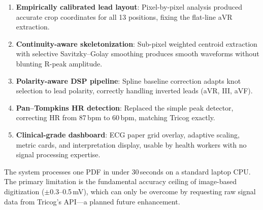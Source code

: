 \documentclass[conference]{IEEEtran}
\begin{document}
\begin{enumerate}[noitemsep,topsep=2pt]
  \item \textbf{Empirically calibrated lead layout}: Pixel-by-pixel analysis
        produced accurate crop coordinates for all 13 positions, fixing the
        flat-line aVR extraction.

  \item \textbf{Continuity-aware skeletonization}: Sub-pixel weighted
        centroid extraction with selective Savitzky--Golay smoothing produces
        smooth waveforms without blunting R-peak amplitude.

  \item \textbf{Polarity-aware DSP pipeline}: Spline baseline correction
        adapts knot selection to lead polarity, correctly handling inverted
        leads (aVR, III, aVF).

  \item \textbf{Pan--Tompkins HR detection}: Replaced the simple peak
        detector, correcting HR from 87\,bpm to 60\,bpm, matching Tricog
        exactly.

  \item \textbf{Clinical-grade dashboard}: ECG paper grid overlay, adaptive
        scaling, metric cards, and interpretation display, usable by
        health workers with no signal processing expertise.
\end{enumerate}

The system processes one PDF in under 30\,seconds on a standard laptop CPU.
The primary limitation is the fundamental accuracy ceiling of image-based
digitization ($\pm$0.3--0.5\,mV), which can only be overcome by requesting
raw signal data from Tricog's API---a planned future enhancement.

\end{document}
